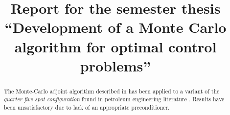 \documentclass[twoside]{IEEEtran}
\begin{document}
\title{Report for the semester thesis ``Development of a Monte Carlo algorithm for optimal control problems''}

\author{
}

\maketitle

\begin{abstract}
The Monte-Carlo adjoint algorithm described in \cite{unsteady} has been applied to a variant of the \emph{quarter five spot configuration} found in petroleum engineering literature \cite{quarterFiveSpot}.
Results have been unsatisfactory due to lack of an appropriate preconditioner.
\end{abstract}
\end{document}
